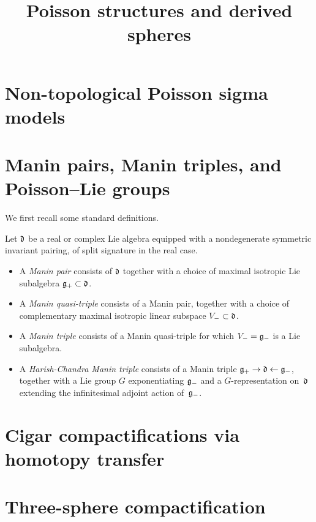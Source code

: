 \documentclass[11pt]{amsart}
\title{Poisson structures and derived spheres}
\begin{document}
\maketitle
\tableofcontents


\section{Non-topological Poisson sigma models}
	

\section{Manin pairs, Manin triples, and Poisson--Lie groups}

We first recall some standard definitions.

\begin{dfn}
    Let $\mathfrak d$ be a real or complex Lie algebra equipped with a nondegenerate symmetric invariant pairing, of split signature in the real case. \begin{itemize}
            \item A \emph{Manin pair} consists of $\mathfrak d$ together with a choice of maximal isotropic Lie subalgebra $\mathfrak g_+ \subset \mathfrak d$. 
            \item A \emph{Manin quasi-triple} consists of a Manin pair, together with a choice of complementary maximal isotropic linear subspace $V_- \subset \mathfrak d$.
            \item A \emph{Manin triple} consists of a Manin quasi-triple for which $V_- = \mathfrak g_-$ is a Lie subalgebra. %
            \item A \emph{Harish-Chandra Manin triple} consists of a Manin triple $\mathfrak g_+ \rightarrow \mathfrak d \leftarrow \mathfrak g_-$, together with a Lie group $G$ exponentiating $\mathfrak g_-$ and a $G$-representation on~$\mathfrak d$ extending the infinitesimal adjoint action of~$\mathfrak g_-$.
        \end{itemize}
\end{dfn}

\section{Cigar compactifications via homotopy transfer}


\section{Three-sphere compactification}
		


%

%

\printbibliography
\end{document}
